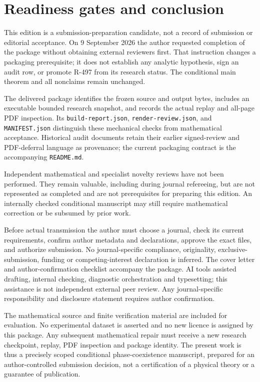 \documentclass[11pt]{article}
\numberwithin{equation}{section}
\theoremstyle{definition}
\begin{document}
\section{Readiness gates and conclusion}
\label{sec:readiness}

This edition is a submission-preparation candidate, not a record of submission
or editorial acceptance. On 9 September 2026 the author requested completion
of the package without obtaining external reviewers first. That instruction
changes a packaging prerequisite; it does not establish any analytic
hypothesis, sign an audit row, or promote R-497 from its research status.
The conditional main theorem and all nonclaims remain unchanged.

The delivered package identifies the frozen source and output bytes, includes
an executable bounded research snapshot, and records the actual replay and
all-page PDF inspection. Its \texttt{build-report.json},
\texttt{render-review.json}, and \texttt{MANIFEST.json} distinguish these
mechanical checks from mathematical acceptance. Historical audit documents
retain their earlier signed-review and PDF-deferral language as provenance;
the current packaging contract is the accompanying \texttt{README.md}.

Independent mathematical and specialist novelty reviews have not been
performed. They remain valuable, including during journal refereeing, but are
not represented as completed and are not prerequisites for preparing this
edition. An internally checked conditional manuscript may still require
mathematical correction or be subsumed by prior work.

Before actual transmission the author must choose a journal, check its current
requirements, confirm author metadata and declarations, approve the exact
files, and authorize submission. No journal-specific compliance, originality,
exclusive-submission, funding or competing-interest declaration is inferred.
The cover letter and author-confirmation checklist accompany the package.
AI tools assisted drafting, internal checking, diagnostic orchestration and
typesetting; this assistance is not independent external peer review. Any
journal-specific responsibility and disclosure statement requires author
confirmation.

The mathematical source and finite verification material are included for
evaluation. No experimental dataset is asserted and no new licence is assigned
by this package. Any subsequent mathematical repair must receive a new
research checkpoint, replay, PDF inspection and package identity. The present
work is thus a precisely scoped conditional phase-coexistence manuscript,
prepared for an author-controlled submission decision, not a certification
of a physical theory or a guarantee of publication.
\end{document}
